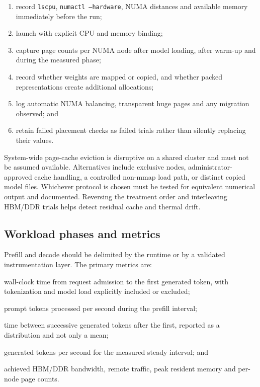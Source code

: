 \begin{enumerate}
  \item record \texttt{lscpu}, \texttt{numactl --hardware}, NUMA
        distances and available memory immediately before the run;
  \item launch with explicit CPU and memory binding;
  \item capture page counts per NUMA node after model loading, after
        warm-up and during the measured phase;
  \item record whether weights are mapped or copied, and whether packed
        representations create additional allocations;
  \item log automatic NUMA balancing, transparent huge pages and any
        migration observed; and
  \item retain failed placement checks as failed trials rather than
        silently replacing their values.
\end{enumerate}

System-wide page-cache eviction is disruptive on a shared cluster and
must not be assumed available.  Alternatives include exclusive nodes,
administrator-approved cache handling, a controlled non-mmap load path,
or distinct copied model files.  Whichever protocol is chosen must be
tested for equivalent numerical output and documented.  Reversing the
treatment order and interleaving HBM/DDR trials helps detect residual
cache and thermal drift.

\subsection{Workload phases and metrics}

Prefill and decode should be delimited by the runtime or by a validated
instrumentation layer.  The primary metrics are:

\begin{description}[leftmargin=3.1cm, style=nextline, itemsep=4pt]
  \item[TTFT] wall-clock time from request admission to the first
        generated token, with tokenization and model load explicitly
        included or excluded;
  \item[prefill throughput] prompt tokens processed per second during
        the prefill interval;
  \item[ITL] time between successive generated tokens after the first,
        reported as a distribution and not only a mean;
  \item[decode throughput] generated tokens per second for the measured
        steady interval; and
  \item[memory evidence] achieved HBM/DDR bandwidth, remote traffic,
        peak resident memory and per-node page counts.
\end{description}


